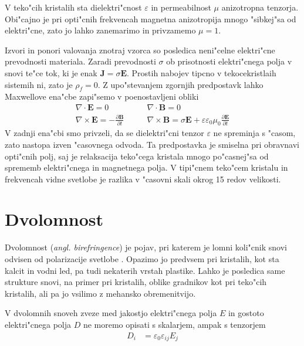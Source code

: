 \documentclass[12pt,twoside,openright,final,a4paper]{report}
\newcommand{\odvod}[2]{\frac{\partial #1}{\partial #2}}
\renewcommand{\vec}{\mathbf}
\newcommand{\angl}[1]{(\textit{angl. #1})}
\begin{document}
V teko"cih kristalih sta dielektri"cnost $\varepsilon$ in permeabilnost $\mu$ anizotropna tenzorja. 
Obi"cajno je pri opti"cnih frekvencah magnetna anizotropija mnogo "sibkej"sa od elektri"cne, zato jo lahko zanemarimo in privzamemo $\mu = 1$. 

Izvori in ponori valovanja znotraj vzorca so posledica neni"celne elektri"cne prevodnosti materiala.
Zaradi prevodnosti $\sigma$ ob prisotnosti elektri"cnega polja v snovi te"ce tok, ki je enak $\vec J = \sigma \vec E$. 
Prostih nabojev tipcno v tekocekristlaih sistemih ni, zato je $\rho_f=0$. 
Z upo"stevanjem zgornjih predpostavk lahko Maxwellove ena"cbe zapi"semo v poenostavljeni obliki
\begin{equation}
  \begin{aligned}
  \nabla \cdot \vec E = 0 & \qquad \nabla \cdot \vec B = 0 \\
  \nabla \times \vec E = -\odvod{\vec B}{t} & \qquad \nabla \times \vec B = \sigma \vec E + \varepsilon\varepsilon_0\mu_0\odvod{\vec E}{t}
  \end{aligned}
\end{equation}
V zadnji ena"cbi smo privzeli, da se dielektri"cni tenzor $\varepsilon$ ne spreminja s "casom, zato nastopa izven "casovnega odvoda. 
Ta predpostavka je smiselna pri obravnavi opti"cnih polj, saj je relaksacija teko"cega kristala mnogo po"casnej"sa od sprememb elektri"cnega in magnetnega polja. 
V tipi"cnem teko"cem kristalu in frekvencah vidne svetlobe je razlika v "casovni skali okrog 15 redov velikosti. 

\section{Dvolomnost}
Dvolomnost \angl{birefringence} je pojav, pri katerem je lomni koli"cnik snovi odvisen od polarizacije svetlobe \cite{landau-lifsic-optics, wiki:birefringence}. 
Opazimo jo predvsem pri kristalih, kot sta kalcit in vodni led, pa tudi nekaterih vrstah plastike. 
Lahko je posledica same strukture snovi, na primer pri kristalih, oblike gradnikov kot pri teko"cih kristalih, ali pa jo vsilimo z mehansko obremenitvijo. 

V dvolomnih snoveh zveze med jakostjo elektri"cnega polja $E$ in gostoto elektri"cnega polja $D$ ne moremo opisati s skalarjem, ampak s tenzorjem
\begin{align}
  D_i &= \varepsilon_0 \varepsilon_{ij} E_j
\end{align}
\end{document}
